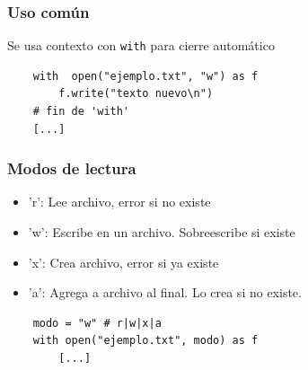 \documentclass[14pt,aspectratio=169,xcolor=dvipsnames]{beamer}
\begin{document}
\begin{frame}[fragile]\frametitle{Uso común}
    Se usa contexto con {\color{purple}\texttt{with}} para cierre automático
    \begin{verbatim}
    with  open("ejemplo.txt", "w") as f
        f.write("texto nuevo\n") 
    # fin de 'with'
    [...]
    \end{verbatim}
\end{frame}
\begin{frame}[fragile]\frametitle{Modos de lectura}
    \begin{itemize}
        \item 'r': Lee archivo, error si no existe
        \item 'w': Escribe en un archivo. Sobreescribe si existe
        \item 'x': Crea archivo, error si ya existe
        \item 'a': Agrega a archivo al final. Lo crea si no existe.

    \end{itemize}
    
    \vspace{1cm}
    \begin{verbatim}
    modo = "w" # r|w|x|a
    with open("ejemplo.txt", modo) as f
        [...]
    \end{verbatim}
\end{frame}
\begin{frame}


\end{frame}
\end{document}
